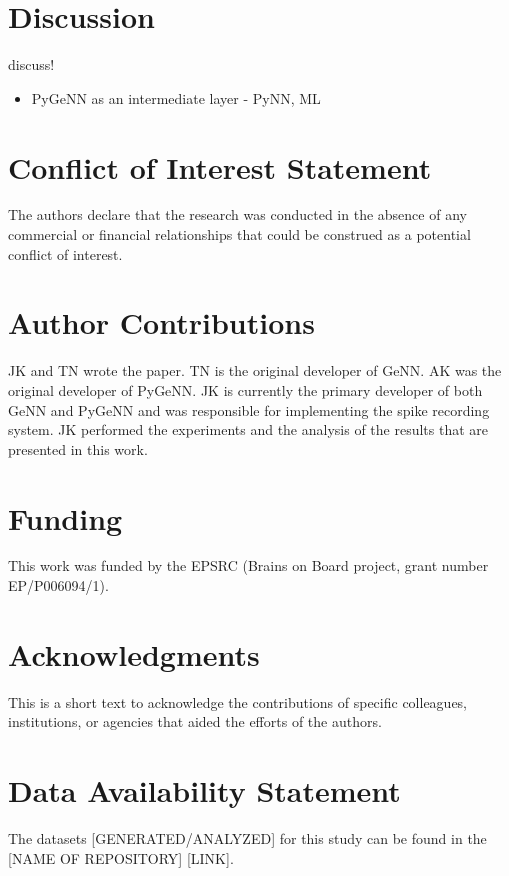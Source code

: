 \documentclass[utf8]{frontiersSCNS} %
\begin{document}
\section{Discussion}
discuss!
\begin{itemize}
    \item PyGeNN as an intermediate layer - PyNN, ML
\end{itemize}

\section*{Conflict of Interest Statement}
The authors declare that the research was conducted in the absence of any commercial or financial relationships that could be construed as a potential conflict of interest.

\section*{Author Contributions}
JK and TN wrote the paper.
TN is the original developer of GeNN.
AK was the original developer of PyGeNN.
JK is currently the primary developer of both GeNN and PyGeNN and was responsible for implementing the spike recording system.
JK performed the experiments and the analysis of the results that are presented in this work.

\section*{Funding}
This work was funded by the EPSRC (Brains on Board project, grant number EP/P006094/1).

\section*{Acknowledgments}
This is a short text to acknowledge the contributions of specific colleagues, institutions, or agencies that aided the efforts of the authors.

\section*{Data Availability Statement}
The datasets [GENERATED/ANALYZED] for this study can be found in the [NAME OF REPOSITORY] [LINK].


\end{document}
